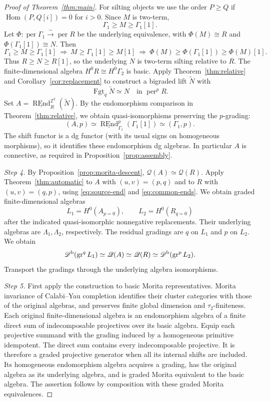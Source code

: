 \documentclass[12pt,a4paper,english,reqno]{amsart}
\theoremstyle{plain}
\theoremstyle{definition}
\numberwithin{equation}{section}
\newcommand{\thmref}[1]{Theorem~\ref{#1}}
\newcommand{\prpref}[1]{Proposition~\ref{#1}}
\newcommand{\corref}[1]{Corollary~\ref{#1}}
\def\ta{\tau}
\def\Ga{\Gamma}
\def\La{\Lambda}
\def\Ph{\Phi}
\def\Hom{\operatorname{Hom}}
\def\Db{{\mathcal D}^{\text{\rm b}}}
\def\perf{\operatorname{per}}
\def\bbZ{{\mathbb Z}}
\def\iso{\cong}
\def\ya#1{\xrightarrow{#1}}
\newcommand{\Fgt}{\operatorname{Fgt}}
\def\REnd{\operatorname{REnd}}
\def\gr{\operatorname{gr}}
\newcommand{\uREnd}{\underline{\REnd}}
\begin{document}
\begin{proof}[Proof of \thmref{thm:main}]
For silting objects we use the order $P\ge Q$ if $\Hom(P,Q[i])=0$ for $i>0$. Since $M$ is two-term,
\[
 \Ga_1\ge M\ge\Ga_1[1].
\]
Let $\Ph:\perf\Ga_1\ya{\sim}\perf R$ be the underlying equivalence, with $\Ph(M)\iso R$ and $\Ph(\Ga_1[1])\iso N$. Then
\[
 \Ga_1\ge M\ge\Ga_1[1]
 \ \Longrightarrow\ M\ge\Ga_1[1]\ge M[1]
 \ \Longrightarrow\ \Ph(M)\ge\Ph(\Ga_1[1])\ge\Ph(M)[1].
\]
Thus $R\ge N\ge R[1]$, so the underlying $N$ is two-term silting relative to $R$. The finite-dimensional algebra $H^0R\iso H^0\Ga_2$ is basic. Apply \thmref{thm:relative} and \corref{cor:replacement} to construct a bigraded lift $\widetilde N$ with
\[
 \Fgt_q\widetilde N\simeq N\quad\text{in }\perf^pR.
\]
Set $A=\uREnd_R^{\bbZ^2}(\widetilde N)$. By the endomorphism comparison in \thmref{thm:relative}, we obtain quasi-isomorphisms preserving the $p$-grading:
\begin{equation}\label{eq:source-end}
 (A,p)\simeq
 \uREnd^p_{\Ga_1}(\Ga_1[1])
 \simeq(\Ga_1,p).
\end{equation}
The shift functor is a dg functor (with its usual signs on homogeneous morphisms), so it identifies these endomorphism dg algebras. In particular $A$ is connective, as required in \prpref{prop:assembly}.

\medskip\noindent\emph{Step 4.}
By \prpref{prop:morita-descent},
$\mathcal Q(A)\simeq\mathcal Q(R)$.
Apply \thmref{thm:automatic} to $A$ with $(u,v)=(p,q)$ and to $R$ with $(u,v)=(q,p)$, using \eqref{eq:source-end} and \eqref{eq:common-ends}. We obtain graded finite-dimensional algebras
\[
 L_1=H^0(A_{p=0}),\qquad L_2=H^0(R_{q=0})
\]
after the indicated quasi-isomorphic nonnegative replacements. Their underlying algebras are $\La_1,\La_2$, respectively. The residual gradings are $q$ on $L_1$ and $p$ on $L_2$. We obtain
\[
 \Db(\gr^qL_1)\simeq\mathcal Q(A)
 \simeq\mathcal Q(R)\simeq\Db(\gr^pL_2).
\]
Transport the gradings through the underlying algebra isomorphisms.

\medskip\noindent\emph{Step 5.}
First apply the construction to basic Morita representatives. Morita invariance of Calabi--Yau completion \cite[Proposition 4.2]{Keller} identifies their cluster categories with those of the original algebras, and preserves finite global dimension and $\ta_2$-finiteness. Each original finite-dimensional algebra is an endomorphism algebra of a finite direct sum of indecomposable projectives over its basic algebra. Equip each projective summand with the grading induced by a homogeneous primitive idempotent. The direct sum contains every indecomposable projective. It is therefore a graded projective generator when all its internal shifts are included. Its homogeneous endomorphism algebra acquires a grading, has the original algebra as its underlying algebra, and is graded Morita equivalent to the basic algebra. The assertion follows by composition with these graded Morita equivalences.
\end{proof}
\end{document}
